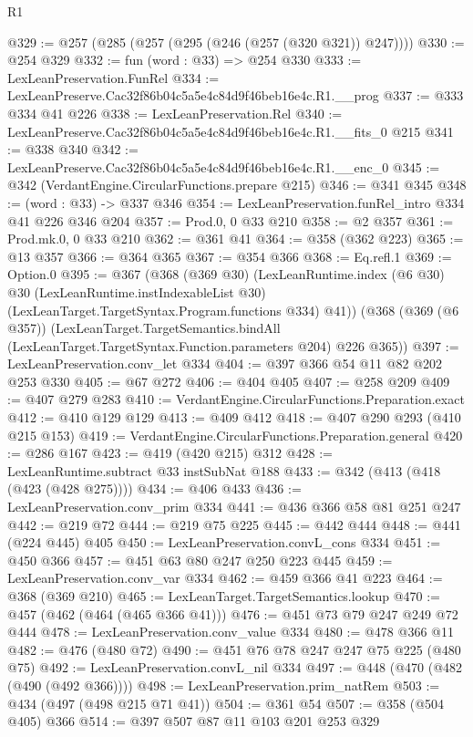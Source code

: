 \begin{lexlean}{R1}
\begin{coremodule}
@329 := @257 (@285 (@257 (@295 (@246 (@257 (@320 @321)) @247))))
@330 := @254 @329
@332 := fun (word : @33) => @254 @330
@333 := LexLeanPreservation.FunRel
@334 := LexLeanPreserve.Cac32f86b04c5a5e4c84d9f46beb16e4c.R1.__prog
@337 := @333 @334 @41 @226
@338 := LexLeanPreservation.Rel
@340 := LexLeanPreserve.Cac32f86b04c5a5e4c84d9f46beb16e4c.R1.__fits_0 @215
@341 := @338 @340
@342 := LexLeanPreserve.Cac32f86b04c5a5e4c84d9f46beb16e4c.R1.__enc_0
@345 := @342 (VerdantEngine.CircularFunctions.prepare @215)
@346 := @341 @345
@348 := (word : @33) -> @337 @346
@354 := LexLeanPreservation.funRel_intro @334 @41 @226 @346 @204
@357 := Prod.{0, 0} @33 @210
@358 := @2 @357
@361 := Prod.mk.{0, 0} @33 @210
@362 := @361 @41
@364 := @358 (@362 @223)
@365 := @13 @357
@366 := @364 @365
@367 := @354 @366
@368 := Eq.refl.{1}
@369 := Option.{0}
@395 := @367
    (@368
      (@369 @30)
      (LexLeanRuntime.index
        (@6 @30)
        @30
        (LexLeanRuntime.instIndexableList @30)
        (LexLeanTarget.TargetSyntax.Program.functions @334)
        @41))
    (@368
      (@369 (@6 @357))
      (LexLeanTarget.TargetSemantics.bindAll
        (LexLeanTarget.TargetSyntax.Function.parameters @204)
        @226
        @365))
@397 := LexLeanPreservation.conv_let @334
@404 := @397 @366 @54 @11 @82 @202 @253 @330
@405 := @67 @272
@406 := @404 @405
@407 := @258 @209
@409 := @407 @279 @283
@410 := VerdantEngine.CircularFunctions.Preparation.exact
@412 := @410 @129 @129
@413 := @409 @412
@418 := @407 @290 @293 (@410 @215 @153)
@419 := VerdantEngine.CircularFunctions.Preparation.general
@420 := @286 @167
@423 := @419 (@420 @215) @312
@428 := LexLeanRuntime.subtract @33 instSubNat @188
@433 := @342 (@413 (@418 (@423 (@428 @275))))
@434 := @406 @433
@436 := LexLeanPreservation.conv_prim @334
@441 := @436 @366 @58 @81 @251 @247
@442 := @219 @72
@444 := @219 @75 @225
@445 := @442 @444
@448 := @441 (@224 @445) @405
@450 := LexLeanPreservation.convL_cons @334
@451 := @450 @366
@457 := @451 @63 @80 @247 @250 @223 @445
@459 := LexLeanPreservation.conv_var @334
@462 := @459 @366 @41 @223
@464 := @368 (@369 @210)
@465 := LexLeanTarget.TargetSemantics.lookup
@470 := @457 (@462 (@464 (@465 @366 @41)))
@476 := @451 @73 @79 @247 @249 @72 @444
@478 := LexLeanPreservation.conv_value @334
@480 := @478 @366 @11
@482 := @476 (@480 @72)
@490 := @451 @76 @78 @247 @247 @75 @225 (@480 @75)
@492 := LexLeanPreservation.convL_nil @334
@497 := @448 (@470 (@482 (@490 (@492 @366))))
@498 := LexLeanPreservation.prim_natRem
@503 := @434 (@497 (@498 @215 @71 @41))
@504 := @361 @54
@507 := @358 (@504 @405) @366
@514 := @397 @507 @87 @11 @103 @201 @253 @329

\end{coremodule}
\end{lexlean}
